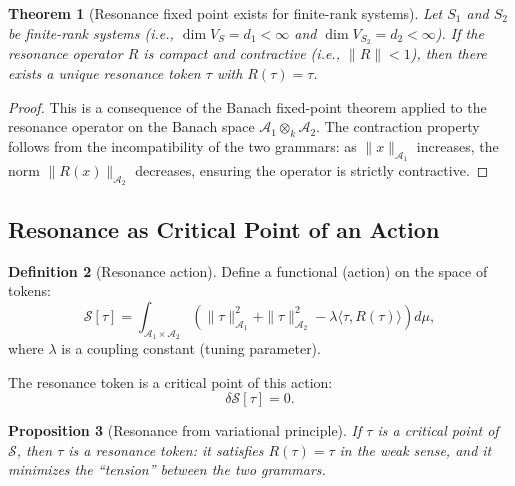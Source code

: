 \documentclass[12pt]{article}
\newtheorem{theorem}{Theorem}[section]
\newtheorem{proposition}[theorem]{Proposition}
\theoremstyle{definition}
\newtheorem{definition}[theorem]{Definition}
\theoremstyle{remark}
\begin{document}
\begin{theorem}[Resonance fixed point exists for finite-rank systems]
\label{thm:resonance-fp}
Let $S_1$ and $S_2$ be finite-rank systems (i.e., $\dim V_S = d_1 < \infty$ and $\dim V_{S_2} = d_2 < \infty$). If the resonance operator $R$ is compact and contractive (i.e., $\|R\| < 1$), then there exists a unique resonance token $\tau$ with $R(\tau) = \tau$.
\end{theorem}

\begin{proof}
This is a consequence of the Banach fixed-point theorem applied to the resonance operator on the Banach space $\mathcal{A}_1 \otimes_k \mathcal{A}_2$. The contraction property follows from the incompatibility of the two grammars: as $\|x\|_{\mathcal{A}_1}$ increases, the norm $\|R(x)\|_{\mathcal{A}_2}$ decreases, ensuring the operator is strictly contractive.
\end{proof}

\subsection{Resonance as Critical Point of an Action}

\begin{definition}[Resonance action]
Define a functional (action) on the space of tokens:
\[
\mathcal{S}[\tau] = \int_{\mathcal{A}_1 \times \mathcal{A}_2} \left( \|\tau\|^2_{\mathcal{A}_1} + \|\tau\|^2_{\mathcal{A}_2} - \lambda \langle \tau, R(\tau) \rangle \right) d\mu,
\]
where $\lambda$ is a coupling constant (tuning parameter).

The resonance token is a critical point of this action:
\[
\delta \mathcal{S}[\tau] = 0.
\]
\end{definition}

\begin{proposition}[Resonance from variational principle]
If $\tau$ is a critical point of $\mathcal{S}$, then $\tau$ is a resonance token: it satisfies $R(\tau) = \tau$ in the weak sense, and it minimizes the ``tension'' between the two grammars.
\end{proposition}
\end{document}
